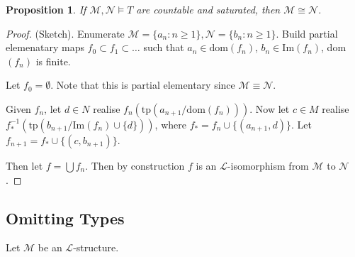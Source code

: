\documentclass[]{article}
\theoremstyle{custhm}
\theoremstyle{cusdef}
\theoremstyle{custhm}
\theoremstyle{custhm}
\theoremstyle{custhm}
\newtheorem{prop}[theorem]{Proposition}
\theoremstyle{ex}
\theoremstyle{custhm}
\theoremstyle{cusdef}
\theoremstyle{remark}
\theoremstyle{remark}
\renewcommand{\L}{\mathcal{L}}
\newcommand{\M}{\mathcal{M}}
\newcommand{\tp}{\textrm{tp}}
\newcommand{\N}{\mathcal{N}}
\begin{document}
\begin{prop}
If $\M,\N\models T$ are countable and saturated, then $\M\cong\N$.
\end{prop}
\begin{proof}
(Sketch). Enumerate $\M = \{a_n:n\ge 1\},\N = \{b_n:n\ge 1\}$. Build partial elemenatary maps $f_0\subset f_1\subset \dots$ such that $a_n \in \textrm{dom}(f_n)$, $b_n\in \textrm{Im}(f_n)$, dom$(f_n)$ is finite.

Let $f_0 = \emptyset$. Note that this is partial elementary since $\M\equiv \N$.

Given $f_n$, let $d\in N$ realise $f_n\left(\tp\left(a_{n+1}/\textrm{dom}(f_n)\right)\right)$. Now let $c\in M$ realise $f_\ast^{-1}(\tp(b_{n+1}/\textrm{Im}(f_n)\cup\{d\}))$, where $f_\ast = f_n\cup\{(a_{n+1},d)\}$. Let $f_{n+1} = f_\ast \cup \{(c,b_{n+1})\}$.

Then let $f = \bigcup f_n$. Then by construction $f$ is an $\L$-isomorphism from $\M$ to $\N$.
\end{proof}

\subsection*{Omitting Types}

Let $\M$ be an $\L$-structure.
\end{document}
